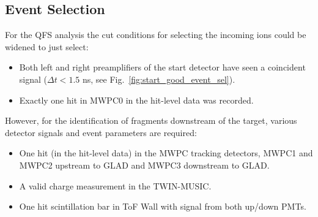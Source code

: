 \subsection{Event Selection}
For the QFS analysis the cut conditions for selecting the incoming ions could be widened to just select:
\begin{itemize}
\item Both left and right preamplifiers of the start detector have seen a coincident signal ($\Delta t < 1.5$ ns, see Fig.~\ref{fig:start_good_event_sel}).
\item Exactly one hit in MWPC0 in the hit-level data was recorded.
\end{itemize}
However, for the identification of fragments downstream of the target, various detector signals and event parameters are required:
\begin{itemize} 
\item One hit (in the hit-level data) in the MWPC tracking detectors, MWPC1 and MWPC2 upstream to GLAD and MWPC3 downstream to GLAD.
\item A valid charge measurement in the TWIN-MUSIC.
\item One hit scintillation bar in ToF Wall with signal from both up/down PMTs.
\end{itemize}
